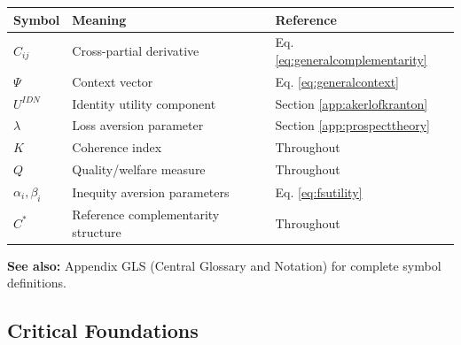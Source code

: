 \begin{center}
\begin{tabular}{@{}lll@{}}
\toprule
\textbf{Symbol} & \textbf{Meaning} & \textbf{Reference} \\
\midrule
$C_{ij}$ & Cross-partial derivative & Eq. \ref{eq:generalcomplementarity} \\
$\Psi$ & Context vector & Eq. \ref{eq:generalcontext} \\
$U^{IDN}$ & Identity utility component & Section \ref{app:akerlofkranton} \\
$\lambda$ & Loss aversion parameter & Section \ref{app:prospecttheory} \\
$K$ & Coherence index & Throughout \\
$Q$ & Quality/welfare measure & Throughout \\
$\alpha_i, \beta_i$ & Inequity aversion parameters & Eq. \ref{eq:fsutility} \\
$C^*$ & Reference complementarity structure & Throughout \\
\bottomrule
\end{tabular}
\end{center}

\textbf{See also:} Appendix GLS (Central Glossary and Notation) for complete symbol definitions.


\subsection{Critical Foundations}
\label{sec:A-foundations}


